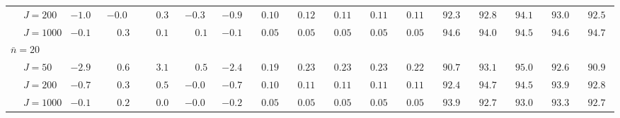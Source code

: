 \begin{sidewaystable}
\begin{threeparttable}
\begin{tabular}{llccccccccccccccc}
 & \nopagebreak $\;J=200$  & ${-}1.0\phantom{0}$ & ${-}0.0\phantom{0}$ & $\phantom{-}0.3\phantom{0}$ & ${-}0.3\phantom{0}$ & ${-}0.9\phantom{0}$ & $\phantom{0}0.10\phantom{0}$ & $\phantom{0}0.12\phantom{0}$ & $\phantom{0}0.11\phantom{0}$ & $\phantom{0}0.11\phantom{0}$ & $\phantom{0}0.11\phantom{0}$ & $\phantom{0}92.3\phantom{0}$ & $\phantom{0}92.8\phantom{0}$ & $\phantom{0}94.1\phantom{0}$ & $\phantom{0}93.0\phantom{0}$ & $\phantom{0}92.5\phantom{0}$ \\
 & \nopagebreak $\;J=1000$  & ${-}0.1\phantom{0}$ & $\phantom{-}0.3\phantom{0}$ & $\phantom{-}0.1\phantom{0}$ & $\phantom{-}0.1\phantom{0}$ & ${-}0.1\phantom{0}$ & $\phantom{0}0.05\phantom{0}$ & $\phantom{0}0.05\phantom{0}$ & $\phantom{0}0.05\phantom{0}$ & $\phantom{0}0.05\phantom{0}$ & $\phantom{0}0.05\phantom{0}$ & $\phantom{0}94.6\phantom{0}$ & $\phantom{0}94.0\phantom{0}$ & $\phantom{0}94.5\phantom{0}$ & $\phantom{0}94.6\phantom{0}$ & $\phantom{0}94.7\phantom{0}$ \\
\multicolumn{4}{l}{$\bar{n}=20$} \\  & \nopagebreak $\;J=50$  & ${-}2.9\phantom{0}$ & $\phantom{-}0.6\phantom{0}$ & $\phantom{-}3.1\phantom{0}$ & $\phantom{-}0.5\phantom{0}$ & ${-}2.4\phantom{0}$ & $\phantom{0}0.19\phantom{0}$ & $\phantom{0}0.23\phantom{0}$ & $\phantom{0}0.23\phantom{0}$ & $\phantom{0}0.23\phantom{0}$ & $\phantom{0}0.22\phantom{0}$ & $\phantom{0}90.7\phantom{0}$ & $\phantom{0}93.1\phantom{0}$ & $\phantom{0}95.0\phantom{0}$ & $\phantom{0}92.6\phantom{0}$ & $\phantom{0}90.9\phantom{0}$ \\
 & \nopagebreak $\;J=200$  & ${-}0.7\phantom{0}$ & $\phantom{-}0.3\phantom{0}$ & $\phantom{-}0.5\phantom{0}$ & ${-}0.0\phantom{0}$ & ${-}0.7\phantom{0}$ & $\phantom{0}0.10\phantom{0}$ & $\phantom{0}0.11\phantom{0}$ & $\phantom{0}0.11\phantom{0}$ & $\phantom{0}0.11\phantom{0}$ & $\phantom{0}0.11\phantom{0}$ & $\phantom{0}92.4\phantom{0}$ & $\phantom{0}94.7\phantom{0}$ & $\phantom{0}94.5\phantom{0}$ & $\phantom{0}93.9\phantom{0}$ & $\phantom{0}92.8\phantom{0}$ \\
 & \nopagebreak $\;J=1000$  & ${-}0.1\phantom{0}$ & $\phantom{-}0.2\phantom{0}$ & $\phantom{-}0.0\phantom{0}$ & ${-}0.0\phantom{0}$ & ${-}0.2\phantom{0}$ & $\phantom{0}0.05\phantom{0}$ & $\phantom{0}0.05\phantom{0}$ & $\phantom{0}0.05\phantom{0}$ & $\phantom{0}0.05\phantom{0}$ & $\phantom{0}0.05\phantom{0}$ & $\phantom{0}93.9\phantom{0}$ & $\phantom{0}92.7\phantom{0}$ & $\phantom{0}93.0\phantom{0}$ & $\phantom{0}93.3\phantom{0}$ & $\phantom{0}92.7\phantom{0}$ \\

\end{tabular}
\end{threeparttable}
\end{sidewaystable}
